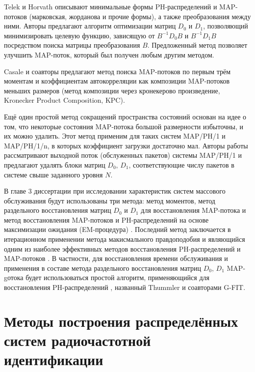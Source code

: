 Telek и Horvath \cite{2007_Telek_Horvath} описывают минимальные формы PH-распределений и MAP-потоков (марковская, жорданова и прочие формы), а также преобразования между ними. Авторы предлагают алгоритм оптимизации матриц $D_0$ и $D_1$, позволяющий минимизировать целевую функцию, зависящую от $B^{-1}D_{0}B$ и $B^{-1}D_{1}B$ посредством поиска матрицы преобразования $B$. Предложенный метод позволяет улучшить MAP-поток, который был получен любым другим методом.

Casale и соавторы \cite{2010_Casale_Zhang_Smirni} предлагают метод поиска MAP-потоков по первым трём моментам и коэффициентам автокорреляции как композиции MAP-потоков меньших размеров (метод композиции через кронекерово произведение, Kronecker Product Composition, KPC).

Ещё один простой метод сокращений пространства состояний основан на идее о том, что некоторые состояния MAP-потока большой размерности избыточны, и их можно удалить. Этот метод применим для таких систем MAP/PH/1 и MAP/PH/1/n, в которых коэффициент загрузки достаточно мал. Авторы работы \cite{2010_Horvath_Horvath_Telek} рассматривают выходной поток (обслуженных пакетов) системы MAP/PH/1 и предлагают удалять блоки матриц $D_0,\,D_1$, соответствующие числу пакетов в системе свыше заданного уровня $N$.

В главе 3 диссертации при исследовании характеристик систем массового обслуживания будут использованы три метода: метод моментов, метод раздельного восстановления матриц $D_0$ и $D_1$ для восстановления MAP-потока \cite{2005-Horvath_Buccholz_Telek} и метод восстановления MAP-потоков и PH-распределений на основе максимизации ожидания (EM-процедура) \cite{2016-Horvath-etal,2005-Bobbio-Horvath-Telek,2005_Thummler_Buchholz_Telek}. Последний метод заключается в итерационном применении метода макисмального правдоподобия и являющийся одним из наиболее эффективных методов восстановления PH-распределений \cite{2005_Thummler_Buchholz_Telek} и MAP-потоков \cite{2013_Horvath_Okamura,2009_Okamura_Dohi}. В частности, для восстановления времени обслуживания и применения в составе метода раздельного восстановления матриц $D_0,\,D_1$ MAP-gотока будет использоваться простой алгоритм, применяющийся для восстановления PH-распределений \cite{2005_Thummler_Buchholz_Telek}, названный Thummler и соавторами G-FIT.





\section{Методы построения распределённых систем радиочастотной идентификации}

